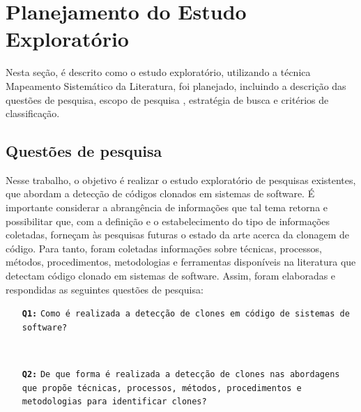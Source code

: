 \section{Planejamento do Estudo Exploratório}
Nesta seção, é descrito como o estudo exploratório, utilizando a técnica Mapeamento Sistemático da Literatura, foi planejado, incluindo a descrição das questões de pesquisa, escopo de pesquisa , estratégia de busca e critérios de classificação.

\subsection{Questões de pesquisa}
Nesse trabalho, o objetivo é realizar o estudo exploratório de pesquisas existentes, que abordam a detecção de códigos clonados em sistemas de software. É importante considerar a abrangência de informações que tal tema retorna e possibilitar que, com a definição e o estabelecimento do tipo de informações coletadas, forneçam às pesquisas futuras o estado da arte acerca da clonagem de código. Para tanto, foram coletadas informações sobre técnicas, processos, métodos, procedimentos, metodologias e ferramentas disponíveis na literatura que detectam código clonado em sistemas de software. Assim, foram elaboradas e respondidas as seguintes questões de pesquisa:
\newline

\begin{itemize}
	\item[\texttt{\textbf{Q1:}}] \texttt{Como é realizada a detecção de clones em código de sistemas de software?}
\end{itemize}
\\

\begin{itemize}
	\item[\texttt{\textbf{Q2:}}] \texttt{De que forma é realizada a detecção de clones nas abordagens que propõe técnicas, processos, métodos, procedimentos e metodologias para identificar clones?}
\end{itemize}
\\

